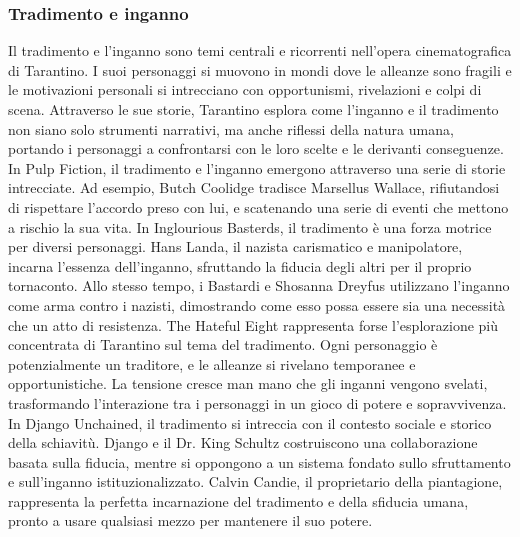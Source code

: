 \documentclass[12pt]{article} %
\begin{document}
\begin{flushleft}
    \subsubsection*{Tradimento e inganno}
    Il tradimento e l’inganno sono temi centrali e ricorrenti nell’opera cinematografica di Tarantino. I suoi personaggi si muovono in mondi dove le alleanze sono fragili e le motivazioni personali si intrecciano con opportunismi, rivelazioni e colpi di scena. Attraverso le sue storie, Tarantino esplora come l’inganno e il tradimento non siano solo strumenti narrativi, ma anche riflessi della natura umana, portando i personaggi a confrontarsi con le loro scelte e le derivanti conseguenze.
    In Pulp Fiction, il tradimento e l’inganno emergono attraverso una serie di storie intrecciate. Ad esempio, Butch Coolidge tradisce Marsellus Wallace, rifiutandosi di rispettare l'accordo preso con lui, e scatenando una serie di eventi che mettono a rischio la sua vita.
    In Inglourious Basterds, il tradimento è una forza motrice per diversi personaggi. Hans Landa, il nazista carismatico e manipolatore, incarna l’essenza dell’inganno, sfruttando la fiducia degli altri per il proprio tornaconto. Allo stesso tempo, i Bastardi e Shosanna Dreyfus utilizzano l’inganno come arma contro i nazisti, dimostrando come esso possa essere sia una necessità che un atto di resistenza.
    The Hateful Eight rappresenta forse l’esplorazione più concentrata di Tarantino sul tema del tradimento. Ogni personaggio è potenzialmente un traditore, e le alleanze si rivelano temporanee e opportunistiche. La tensione cresce man mano che gli inganni vengono svelati, trasformando l’interazione tra i personaggi in un gioco di potere e sopravvivenza. 
    In Django Unchained, il tradimento si intreccia con il contesto sociale e storico della schiavitù. Django e il Dr. King Schultz costruiscono una collaborazione basata sulla fiducia, mentre si oppongono a un sistema fondato sullo sfruttamento e sull’inganno istituzionalizzato. Calvin Candie, il proprietario della piantagione, rappresenta la perfetta incarnazione del tradimento e della sfiducia umana, pronto a usare qualsiasi mezzo per mantenere il suo potere.

\end{flushleft}
\end{document}
